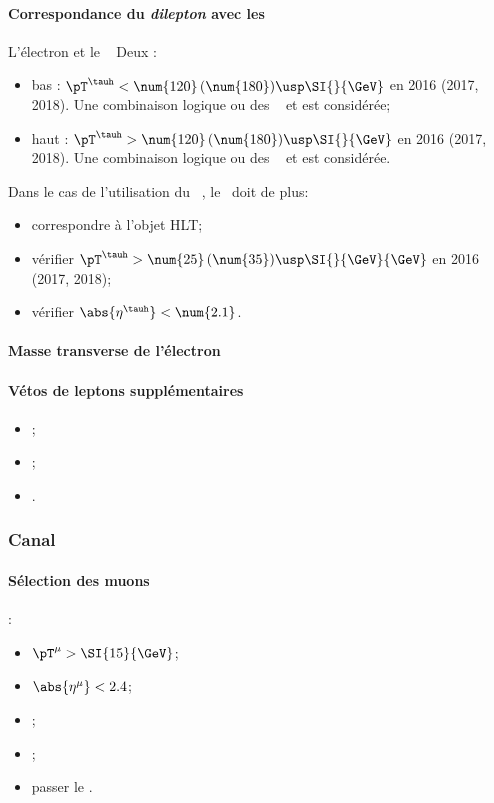 \paragraph{Correspondance du \emph{dilepton} avec les \HLTpaths}
L'électron et le \tauh\ \FromPairMatchToHLTObjects{}
Deux \HLTregionsDefined:
\begin{itemize}
    \item bas \pT: $\pT^{\tauh} < \num{120} \, (\num{180}) \usp \SI{}{\GeV}$ en 2016 (2017, 2018).
        Une combinaison logique \og ou \fg{} des \HLTpaths\ \HLTSingleEle{} et \HLTEleTauCross{} est considérée;
    \item haut \pT: $\pT^{\tauh} > \num{120} \, (\num{180}) \usp \SI{}{\GeV}$ en 2016 (2017, 2018).
        Une combinaison logique \og ou \fg{} des \HLTpaths\ \HLTSingleEle{} et \HLTSingleTau{} est considérée.
\end{itemize}
Dans le cas de l'utilisation du \HLTpath\ \HLTEleTauCross{}, le \tauh\ doit de plus:
\begin{itemize}
    \item correspondre à l'objet HLT;
    \item vérifier $\pT^{\tauh} > \num{25} \, (\num{35}) \usp \SI{}{\GeV}{\GeV}$ en 2016 (2017, 2018);
    \item vérifier $\abs{\eta^{\tauh}} < \num{2.1}$.
\end{itemize}
\paragraph{Masse transverse de l'électron}
\paragraph{Vétos de leptons supplémentaires}
\LeptonVetoes
\begin{itemize}
    \item \LeptonVetoesExtraMuon;
    \item \LeptonVetoesSecondEle;
    \item \LeptonVetoesElectronPair.
\end{itemize}

\subsubsection{Canal \ele\mu}\label{chapter-HTT_analysis-section-offline-em}
\paragraph{Sélection des muons}
:
\begin{itemize}
    \item $\pT^{\mu} > \SI{15}{\GeV}$;
    \item $\abs{\eta^{\mu}} < 2.4$;
    \item \Leptondzdxy;
    \item {};
    \item passer le \MediumMuonID.
\end{itemize}
